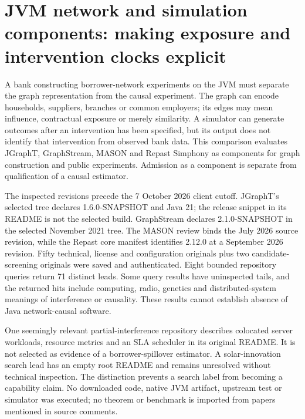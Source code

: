 \section[JVM network contracts]{JVM network and simulation components: making exposure and intervention clocks explicit}
\label{sec:exec25-java-network}

A bank constructing borrower-network experiments on the JVM must separate the graph representation from the causal experiment. The graph can encode households, suppliers, branches or common employers; its edges may mean influence, contractual exposure or merely similarity. A simulator can generate outcomes after an intervention has been specified, but its output does not identify that intervention from observed bank data. This comparison evaluates JGraphT, GraphStream, MASON and Repast Simphony as components for graph construction and public experiments. Admission as a component is separate from qualification of a causal estimator.~\citep{exec25_jnet_jgrapht,exec25_jnet_graphstream,exec25_jnet_mason,exec25_jnet_repast}

The inspected revisions precede the 7 October 2026 client cutoff. JGraphT's selected tree declares 1.6.0-SNAPSHOT and Java 21; the release snippet in its README is not the selected build. GraphStream declares 2.1.0-SNAPSHOT in the selected November 2021 tree. The MASON review binds the July 2026 source revision, while the Repast core manifest identifies 2.12.0 at a September 2026 revision. Fifty technical, license and configuration originals plus two candidate-screening originals were saved and authenticated. Eight bounded repository queries return 71 distinct leads. Some query results have uninspected tails, and the returned hits include computing, radio, genetics and distributed-system meanings of interference or causality. These results cannot establish absence of Java network-causal software.~\citep{exec25_jnet_choice}

One seemingly relevant partial-interference repository describes colocated server workloads, resource metrics and an SLA scheduler in its original README. It is not selected as evidence of a borrower-spillover estimator. A solar-innovation search lead has an empty root README and remains unresolved without technical inspection. The distinction prevents a search label from becoming a capability claim. No downloaded code, native JVM artifact, upstream test or simulator was executed; no theorem or benchmark is imported from papers mentioned in source comments.~\citep{exec25_jnet_choice}

